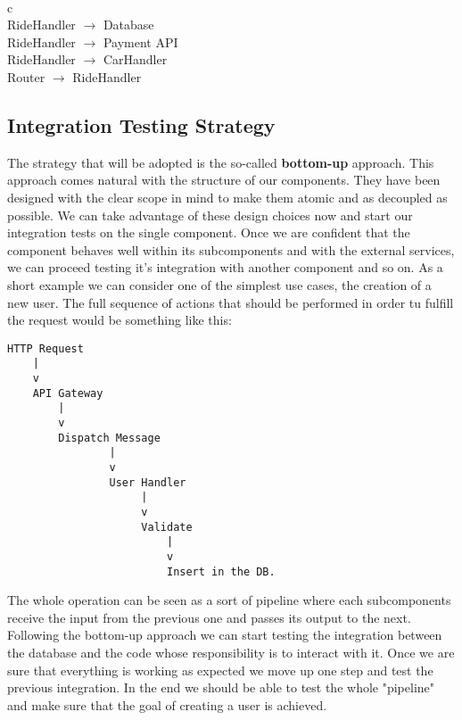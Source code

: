     \\
    \begin{tabular}{ c }
      \hline
       \\
      \hline
      RideHandler $ \rightarrow $ Database \\ \hline
      RideHandler $ \rightarrow $ Payment API \\ \hline
      RideHandler $ \rightarrow $ CarHandler \\ \hline
      Router $ \rightarrow $ RideHandler \\
      \hline
      \vspace{1mm}
    \end{tabular}

\subsection{Integration Testing Strategy}
The strategy that will be adopted is the so-called \textbf{bottom-up} approach.
This approach comes natural with the structure of our components. They have been
designed with the clear scope in mind to make them atomic and as decoupled as possible.
We can take advantage of these design choices now and start our integration tests
on the single component. Once we are confident that the component behaves
well within its subcomponents and with the external services, we can proceed testing
it's integration with another component and so on.
As a short example we can consider one of the simplest use cases, the creation of a new user.
The full sequence of actions that should be performed in order tu fulfill the request
would be something like this:
\lstset{basicstyle=\ttfamily\footnotesize,breaklines=true}
\begin{lstlisting}
HTTP Request
    |
    v
    API Gateway
        |
        v
        Dispatch Message
                |
                v 
                User Handler
                     |
                     v
                     Validate
                         |
                         v
                         Insert in the DB.
\end{lstlisting}
The whole operation can be seen as a sort of pipeline where each subcomponents
receive the input from the previous one and passes its output to the next.
Following the bottom-up approach we can start testing the integration between the
database and the code whose responsibility is to interact with it. Once we are sure
that everything is working as expected we move up one step and test the previous integration.
In the end we should be able to test the whole "pipeline" and make sure that the
goal of creating a user is achieved.

